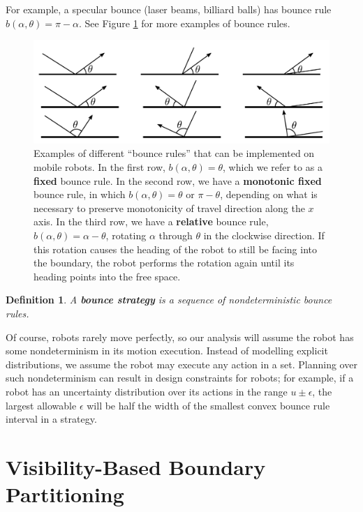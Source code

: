 \documentclass[]{article}
\newtheorem{definition}{Definition}
\begin{document}
For example, a specular bounce (laser beams, billiard balls) has bounce rule 
$b(\alpha, \theta) = \pi - \alpha$. See Figure \ref{fig:bex} for more
examples of bounce rules. 

\begin{figure}
    \includegraphics[width=0.8\linewidth]{figures/bounce_examples.pdf}
    \centering
    \caption[test]{\label{fig:bex}Examples of different ``bounce rules'' that can be implemented on
mobile robots. In the first row, $b(\alpha, \theta) = \theta$, which we refer to
as a \textbf{fixed} bounce rule. In the second row, we have a \textbf{monotonic
fixed} bounce rule, in which
$b(\alpha, \theta) = \theta$ or $\pi-\theta$, depending on what is necessary to
preserve monotonicity of travel direction along the $x$ axis. In the third
row, we have a \textbf{relative} bounce rule, $b(\alpha, \theta) = \alpha - \theta$, rotating $\alpha$ through $\theta$ in the clockwise
direction. If this rotation causes the 
heading of the robot to still be facing into the boundary, the robot 
performs the rotation again until its heading points into the free space.
}
\end{figure}

\begin{definition}
A \textbf{bounce strategy} is a sequence of nondeterministic bounce rules.
\end{definition}

Of course, robots rarely move perfectly, so our analysis will assume the
robot has some nondeterminism in its motion execution.
Instead of modelling explicit
distributions, we assume the robot may execute any action in a set. 
Planning over such nondeterminism can result in design constraints
for robots; for example, if a robot has an uncertainty distribution over its 
actions in the range $u \pm \epsilon$, the largest allowable $\epsilon$ will 
be half the width of the smallest convex bounce rule interval in a strategy.

\section{Visibility-Based Boundary Partitioning} \label{secviz}
\end{document}
